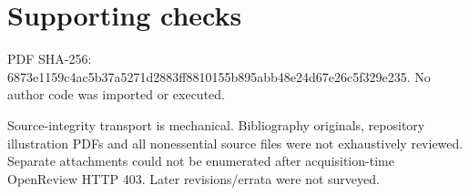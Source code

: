 \documentclass[10pt]{article}
\begin{document}
\section*{Supporting checks}
PDF SHA-256: 6873e1159c4ac5b37a5271d2883ff8810155b895abb48e24d67e26c5f329e235. No author code was imported or executed.\par
Source-integrity transport is mechanical. Bibliography originals, repository illustration PDFs and all nonessential source files were not exhaustively reviewed. Separate attachments could not be enumerated after acquisition-time OpenReview HTTP 403. Later revisions/errata were not surveyed.\par
\end{document}
